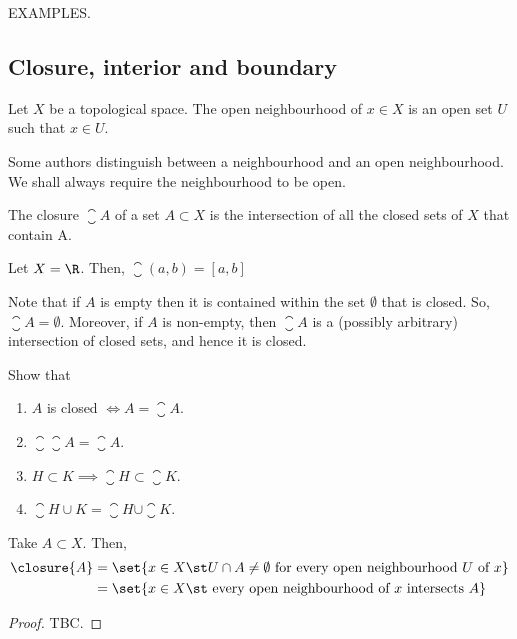 EXAMPLES.

\subsection{Closure, interior and boundary}
\begin{ndfn}[Neighbourhood]
  Let $X$ be a topological space. The open neighbourhood of $x \in X$ is an open set $U$ such that $x \in U$.
\end{ndfn}
Some authors distinguish between a neighbourhood and an open neighbourhood. We shall always require the neighbourhood to be open.

\begin{ndfn}[Closure]
  The closure $\closure{A}$ of a set $A \subset X$ is the intersection of all the closed sets of $X$ that contain A.
\end{ndfn}

\begin{negg}
  Let $X=\R$. Then, $\closure{(a,b)} = [a,b]$
\end{negg}

Note that if $A$ is empty then it is contained within the set $\emptyset$ that is closed. So, $\closure{A} = \emptyset$. Moreover, if $A$ is non-empty, then $\closure{A}$ is a (possibly arbitrary) intersection of closed sets, and hence it is closed.

\begin{exercise}
Show that
\begin{enumerate}
\item $A$ is closed $\iff A = \closure{A}$.
\item $\closure{\closure{A}} = \closure{A}$.
\item $H \subset K \implies \closure{H} \subset \closure{K}$.
\item $\closure{H \cup K} = \closure{H} \cup \closure{K}$.
\end{enumerate}
\end{exercise}

\begin{nlemma}
  Take $A \subset X$. Then,
  \begin{align*}
    \closure{A} &= \set{x \in X \st U \cap A \neq \emptyset \text{ for every open neighbourhood } U \text{ of } x}\\
    &= \set{x \in X \st \text{ every open neighbourhood of } x \text{ intersects } A}\\
  \end{align*}
\end{nlemma}
\begin{proof}
  TBC.
\end{proof}

